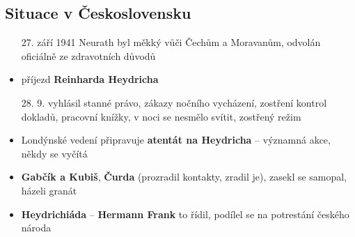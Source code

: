 \documentclass{article}
\begin{document}
\subsection*{Situace v Československu}
\begin{itemize}
  \item[27. září 1941] Neurath byl měkký vůči Čechům a Moravanům, odvolán oficiálně ze zdravotních důvodů
  \item příjezd \textbf{Reinharda Heydricha}
  \item [28. 9.] vyhlásil stanné právo, zákazy nočního vycházení, zostření kontrol dokladů, pracovní knížky, v noci se nesmělo svítit, zostřený režim
  \item Londýnské vedení připravuje \textbf{atentát na Heydricha} -- významná akce, někdy se vyčítá
  \item \textbf{Gabčík a Kubiš}, \textbf{Čurda} (prozradil kontakty, zradil je), zasekl se samopal, házeli granát
  \item \textbf{Heydrichiáda} -- \textbf{Hermann Frank} to řídil, podílel se na potrestání českého národa
\end{itemize}
\end{document}
